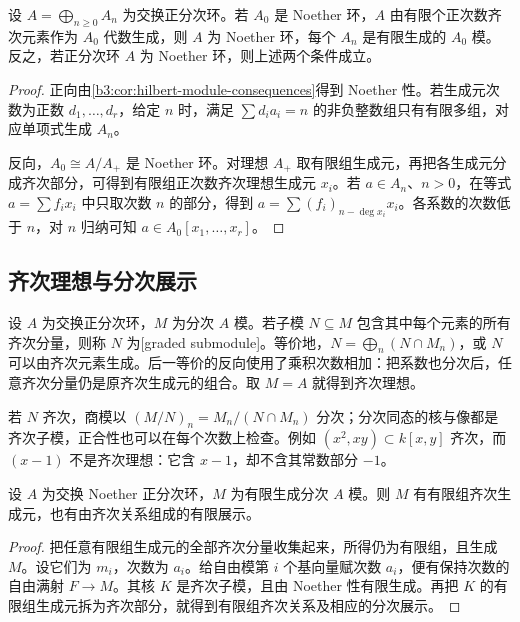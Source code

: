\begin{proposition}\label{b3:prop:graded-noetherian}
	设 \(A=\bigoplus_{n\ge0}A_n\) 为交换正分次环。若 \(A_0\) 是 Noether 环，\(A\) 由有限个正次数齐次元素作为 \(A_0\) 代数生成，则 \(A\) 为 Noether 环，每个 \(A_n\) 是有限生成的 \(A_0\) 模。反之，若正分次环 \(A\) 为 Noether 环，则上述两个条件成立。
\end{proposition}
\begin{proof}
	正向由\cref{b3:cor:hilbert-module-consequences}得到 Noether 性。若生成元次数为正数 \(d_1,\ldots,d_r\)，给定 \(n\) 时，满足 \(\sum d_i a_i=n\) 的非负整数组只有有限多组，对应单项式生成 \(A_n\)。

	反向，\(A_0\cong A/A_+\) 是 Noether 环。对理想 \(A_+\) 取有限组生成元，再把各生成元分成齐次部分，可得到有限组正次数齐次理想生成元 \(x_i\)。若 \(a\in A_n\)、\(n>0\)，在等式 \(a=\sum f_i x_i\) 中只取次数 \(n\) 的部分，得到 \(a=\sum (f_i)_{n-\deg x_i}x_i\)。各系数的次数低于 \(n\)，对 \(n\) 归纳可知 \(a\in A_0[x_1,\ldots,x_r]\)。
\end{proof}

\subsection{齐次理想与分次展示}
\label{b3:subsec:1101:02}

设 \(A\) 为交换正分次环，\(M\) 为分次 \(A\) 模。若子模 \(N\subseteq M\) 包含其中每个元素的所有齐次分量，则称 \(N\) 为[graded submodule]。等价地，\(N=\bigoplus_n(N\cap M_n)\)，或 \(N\) 可以由齐次元素生成。后一等价的反向使用了乘积次数相加：把系数也分次后，任意齐次分量仍是原齐次生成元的组合。取 \(M=A\) 就得到齐次理想。

\ProseParagraphBreak
若 \(N\) 齐次，商模以 \((M/N)_n=M_n/(N\cap M_n)\) 分次；分次同态的核与像都是齐次子模，正合性也可以在每个次数上检查。例如 \((x^2,xy)\subset k[x,y]\) 齐次，而 \((x-1)\) 不是齐次理想：它含 \(x-1\)，却不含其常数部分 \(-1\)。

\begin{proposition}\label{b3:prop:graded-presentation}
	设 \(A\) 为交换 Noether 正分次环，\(M\) 为有限生成分次 \(A\) 模。则 \(M\) 有有限组齐次生成元，也有由齐次关系组成的有限展示。
\end{proposition}
\begin{proof}
	把任意有限组生成元的全部齐次分量收集起来，所得仍为有限组，且生成 \(M\)。设它们为 \(m_i\)，次数为 \(a_i\)。给自由模第 \(i\) 个基向量赋次数 \(a_i\)，便有保持次数的自由满射 \(F\rightarrow M\)。其核 \(K\) 是齐次子模，且由 Noether 性有限生成。再把 \(K\) 的有限组生成元拆为齐次部分，就得到有限组齐次关系及相应的分次展示。
\end{proof}

